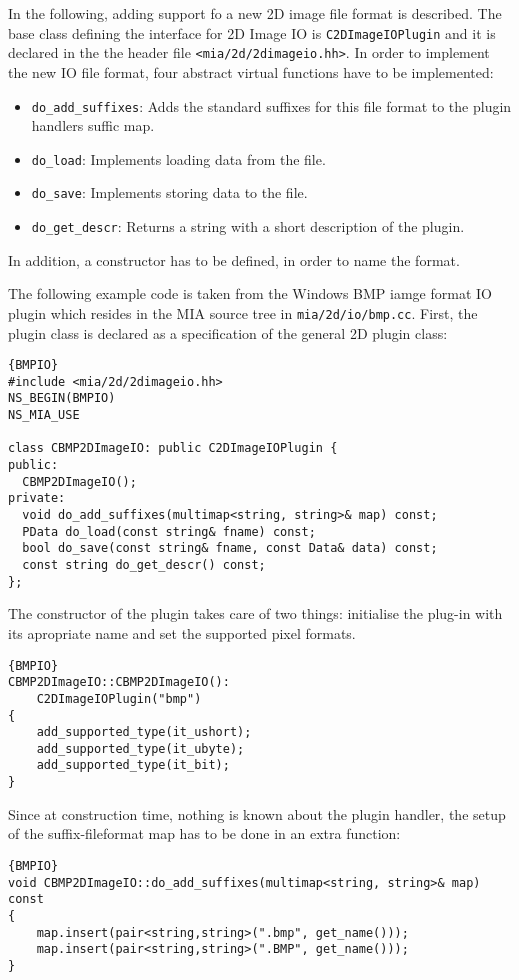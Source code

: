 In the following, adding support fo a new 2D image file format is described. 
The base class defining the interface for 2D Image IO is \texttt{C2DImageIOPlugin} and it is 
  declared in the the header file \texttt{<mia/2d/2dimageio.hh>}. 
In order to implement the new IO file format, four abstract virtual functions have to be implemented: 
\begin{itemize}  
\item {\tt do\_add\_suffixes}: Adds the standard suffixes for this file format to the plugin handlers suffic map. 
\item {\tt do\_load}: Implements loading data from the file. 
\item {\tt do\_save}: Implements storing data to the file. 
\item {\tt do\_get\_descr}: Returns a string with a short description of the plugin.
\end{itemize}  
In addition, a constructor has to be defined, in order to name the format. 

The following example code is taken from the Windows BMP iamge format IO plugin which resides in the MIA source tree in \texttt{mia/2d/io/bmp.cc}.
First, the plugin class is declared as a specification of the general 2D plugin class: 

\begin{lstlisting}{BMPIO}
#include <mia/2d/2dimageio.hh>
NS_BEGIN(BMPIO)
NS_MIA_USE

class CBMP2DImageIO: public C2DImageIOPlugin {
public:
  CBMP2DImageIO();
private: 
  void do_add_suffixes(multimap<string, string>& map) const;
  PData do_load(const string& fname) const;
  bool do_save(const string& fname, const Data& data) const;
  const string do_get_descr() const; 
};
\end{lstlisting}

\noindent 
The constructor of the plugin takes care of two things: initialise the plug-in with its apropriate name and set the supported pixel formats. 

\begin{lstlisting}{BMPIO}
CBMP2DImageIO::CBMP2DImageIO():
	C2DImageIOPlugin("bmp")
{
	add_supported_type(it_ushort);
	add_supported_type(it_ubyte); 
	add_supported_type(it_bit);
}
\end{lstlisting}

\noindent 
Since at construction time, nothing is known about the plugin handler, the setup of the suffix-fileformat map has to be done in an extra function: 
\begin{lstlisting}{BMPIO}
void CBMP2DImageIO::do_add_suffixes(multimap<string, string>& map) const
{
	map.insert(pair<string,string>(".bmp", get_name())); 
	map.insert(pair<string,string>(".BMP", get_name())); 
}
\end{lstlisting}


